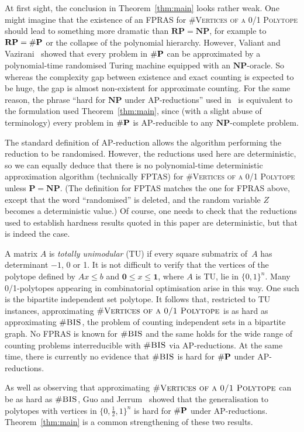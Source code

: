 \documentclass[11pt, oneside]{article}   	%
\def\NP{\ensuremath{\mathbf{NP}}}
\def\RP{\ensuremath{\mathbf{RP}}}
\def\Ptime{\ensuremath{\mathbf{P}}}
\def\numP{\textup{\#}\mathbf{P}}
\def\bfz{\mathbf{0}}
\def\bfo{\mathbf{1}}
\def\nBIS{\textsc{\#BIS}}
\def\nPolytopeVertices{\textsc{\#Vertices of a 0/1 Polytope}}
\begin{document}
At first sight, the conclusion in Theorem~\ref{thm:main} looks rather weak.  One might imagine that the existence of an FPRAS for  \nPolytopeVertices{} should lead to something more dramatic than $\RP=\NP$, for example to $\RP=\numP$ or the collapse of the polynomial hierarchy.  However, Valiant and Vazirani~\cite{NPeasy} showed that every problem in $\numP$ can be approximated by a polynomial-time randomised Turing machine equipped with an $\NP$-oracle.  So whereas the complexity gap between existence and exact counting is expected to be huge, the gap is almost non-existent for approximate counting.  For the same reason, the phrase ``hard for $\NP$ under AP-reductions'' used in~\cite{GuoJerrum} is equivalent to the formulation used Theorem~\ref{thm:main}, since (with a slight abuse of terminology) every problem in $\numP$ is AP-reducible to any $\NP$-complete problem.  

The standard definition of AP-reduction allows the algorithm performing the reduction to be randomised.  However, the reductions used here are deterministic, so we can equally deduce that there is no polynomial-time deterministic approximation algorithm (technically FPTAS) for \nPolytopeVertices{} unless $\Ptime=\NP$.  (The definition for FPTAS matches the one for FPRAS above, except that the word ``randomised'' is deleted, and the random variable $Z$ becomes a deterministic value.)  Of course, one needs to check that the reductions used to establish hardness results quoted in this paper are deterministic, but that is indeed the case.

A matrix $A$ is \textit{totally unimodular} (TU) if every square submatrix of~$A$ has determinant $-1$, 0 or 1.  It is not difficult to verify that the vertices of the polytope defined by $Ax\leq b$ and $\bfz\leq x\leq\bfo$, where $A$ is TU, lie in $\{0,1\}^n$.  
Many 0/1-polytopes appearing in combinatorial optimisation arise in this way.   One such is the bipartite independent set polytope.  It follows that, restricted to TU instances, approximating $\nPolytopeVertices$ is as hard as approximating $\nBIS$, the problem of counting independent sets in a bipartite graph. No FPRAS is known for $\nBIS$ and the same holds for the wide range of counting problems interreducible with $\nBIS$ via AP-reductions.  At the same time, there is currently no evidence that $\nBIS$ is hard for $\numP$ under AP-reductions.  

As well as observing that approximating $\nPolytopeVertices$ can be as hard as $\nBIS$, Guo and Jerrum~\cite{GuoJerrum} showed that the generalisation to polytopes with vertices in $\{0,\frac12,1\}^n$ is hard for $\numP$ under AP-reductions.  Theorem~\ref{thm:main} is a common strengthening of these two results.  
\end{document}
